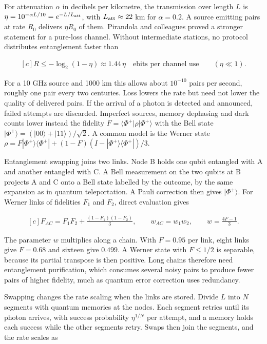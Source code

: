 \documentclass[11pt,oneside]{book}
\newenvironment{centeredalign}{\[\begin{gathered}[c]}{\end{gathered}\]}
\begin{document}
For attenuation \(\alpha\) in decibels per kilometre, the transmission over length \(L\) is \(\eta=10^{-\alpha L/10}=e^{-L/L_{\rm att}}\), with \(L_{\rm att}\approx22\) km for \(\alpha=0.2\). A source emitting pairs at rate \(R_0\) delivers \(\eta R_0\) of them. Pirandola and colleagues proved a stronger statement for a pure-loss channel. Without intermediate stations, no protocol distributes entanglement faster than

\begin{centeredalign}
R\leq-\log_2(1-\eta)\approx1.44\,\eta\quad\text{ebits per channel use}\qquad(\eta\ll1).
\end{centeredalign}

For a 10 GHz source and 1000 km this allows about \(10^{-10}\) pairs per second, roughly one pair every two centuries. Loss lowers the rate but need not lower the quality of delivered pairs. If the arrival of a photon is detected and announced, failed attempts are discarded. Imperfect sources, memory dephasing and dark counts lower instead the fidelity \(F=\langle\Phi^+|\rho|\Phi^+\rangle\) with the Bell state \(|\Phi^+\rangle=(|00\rangle+|11\rangle)/\sqrt2\). A common model is the Werner state \(\rho=F|\Phi^+\rangle\langle\Phi^+|+(1-F)(I-|\Phi^+\rangle\langle\Phi^+|)/3\).

Entanglement swapping joins two links. Node B holds one qubit entangled with A and another entangled with C. A Bell measurement on the two qubits at B projects A and C onto a Bell state labelled by the outcome, by the same expansion as in quantum teleportation. A Pauli correction then gives \(|\Phi^+\rangle\). For Werner links of fidelities \(F_1\) and \(F_2\), direct evaluation gives

\begin{centeredalign}
F_{AC}=F_1F_2+\frac{(1-F_1)(1-F_2)}{3},\qquad w_{AC}=w_1w_2,\qquad w=\frac{4F-1}{3}.
\end{centeredalign}

The parameter \(w\) multiplies along a chain. With \(F=0.95\) per link, eight links give \(F=0.68\) and sixteen give \(0.499\). A Werner state with \(F\leq1/2\) is separable, because its partial transpose is then positive. Long chains therefore need entanglement purification, which consumes several noisy pairs to produce fewer pairs of higher fidelity, much as quantum error correction uses redundancy.

Swapping changes the rate scaling when the links are stored. Divide \(L\) into \(N\) segments with quantum memories at the nodes. Each segment retries until its photon arrives, with success probability \(\eta^{1/N}\) per attempt, and a memory holds each success while the other segments retry. Swaps then join the segments, and the rate scales as
\end{document}
